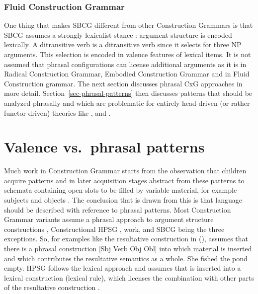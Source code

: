 \documentclass[output=paper]{langsci/langscibook}
\begin{document}






\subsubsection{Fluid Construction Grammar}


One thing that makes SBCG different from other Construction Grammars is that SBCG assumes a strongly
lexicalist stance \citep{SW2011a}: argument structure is encoded lexically. A ditransitive verb is a
ditransitive verb since it selects for three NP arguments. This selection is encoded in valence
features of lexical items. It is not assumed that phrasal configurations can license additional
arguments as it is in Radical Construction Grammar, Embodied Construction Grammar and in Fluid
Construction grammar. The next section discusses phrasal CxG approaches in more
detail. Section~\ref{sec-phrasal-patterns} then discusses patterns that should be analyzed phrasally
and which are problematic for entirely head-driven (or rather functor-driven) theories like ,
 and .



\section{Valence vs.\ phrasal patterns}
\label{sec-valence}

Much work in Construction Grammar starts from the observation that
children acquire patterns and in later acquisition stages abstract from these patterns to schemata
containing open slots to be filled by variable material, for example subjects and objects
\citep{Tomasello2003a}. The conclusion that is drawn from this is that language should be 
described with reference to phrasal patterns. Most Construction Grammar variants assume a phrasal
approach to argument structure constructions \citep{Goldberg95a,Goldberg2006a,GJ2004a},
Constructional HPSG \citep{Sag97a},  work, and SBCG \citep{SBK2012a,Sag2012a} being the
three exceptions. So, for examples like the resultative construction in (),
\citet{Goldberg95a} assumes that there is a phrasal construction [Sbj Verb Obj Obl] into which
material is inserted and which contributes the resultative semantics as a whole.
\ea
She fished the pond empty.
\z
HPSG follows the lexical approach and assumes that  is inserted into a lexical
construction (lexical rule), which licenses the combination with other parts of the resultative
construction \citep{Mueller2002b}.
\end{document}
